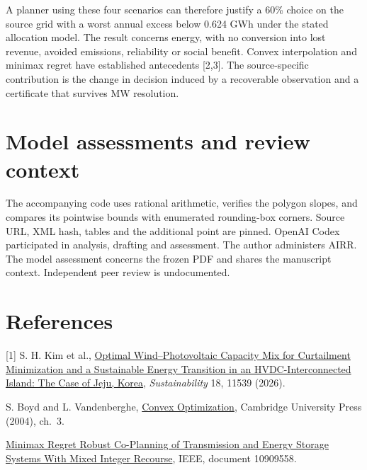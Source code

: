 \documentclass[11pt]{article}
\begin{document}
A planner using these four scenarios can therefore justify a 60\% choice on the source grid with a worst annual excess below 0.624 GWh under the stated allocation model. The result concerns energy, with no conversion into lost revenue, avoided emissions, reliability or social benefit. Convex interpolation and minimax regret have established antecedents [2,3]. The source-specific contribution is the change in decision induced by a recoverable observation and a certificate that survives MW resolution.
\section*{Model assessments and review context}
The accompanying code uses rational arithmetic, verifies the polygon slopes, and compares its pointwise bounds with enumerated rounding-box corners. Source URL, XML hash, tables and the additional point are pinned. OpenAI Codex participated in analysis, drafting and assessment. The author administers AIRR. The model assessment concerns the frozen PDF and shares the manuscript context. Independent peer review is undocumented.
\section*{References}
\small
[1] S. H. Kim et al., \href{https://doi.org/10.3390/su182211539}{Optimal Wind--Photovoltaic Capacity Mix for Curtailment Minimization and a Sustainable Energy Transition in an HVDC-Interconnected Island: The Case of Jeju, Korea}, \emph{Sustainability} 18, 11539 (2026).\par
[2] S. Boyd and L. Vandenberghe, \href{https://web.stanford.edu/~boyd/cvxbook/}{Convex Optimization}, Cambridge University Press (2004), ch.~3.\par
[3] \href{https://ieeexplore.ieee.org/document/10909558}{Minimax Regret Robust Co-Planning of Transmission and Energy Storage Systems With Mixed Integer Recourse}, IEEE, document 10909558.
\end{document}
